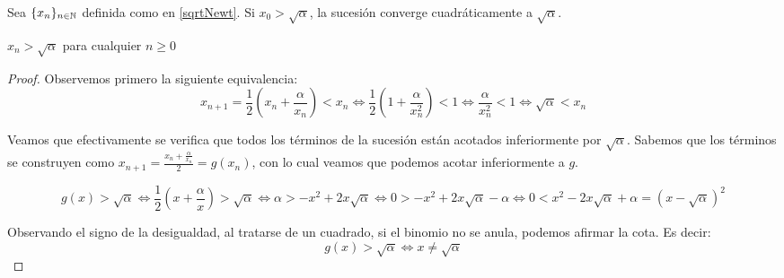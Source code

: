\begin{prop} 
Sea $\{x_n\}_{n\in\mathbb{N}}$ definida como en \ref{sqrtNewt}. Si $x_0 > \sqrt{\alpha}$, la sucesión converge cuadráticamente a $\sqrt{\alpha}$.
\begin{lema}
$x_n > \sqrt{\alpha}$ para cualquier $ n \geq 0$
\begin{proof}
Observemos primero la siguiente equivalencia:
$$x_{n+1} = \displaystyle \frac{1}{2} (x_{n} + \frac{\alpha}{x_{n}}) < x_n \Leftrightarrow \displaystyle \frac{1}{2} (1 + \frac{\alpha}{x^2_{n}}) < 1 \Leftrightarrow \frac{\alpha}{x_n^2} < 1 \Leftrightarrow \sqrt{\alpha} < x_n$$

Veamos que efectivamente se verifica que todos los términos de la sucesión están acotados inferiormente por $\sqrt{\alpha}$. Sabemos que los términos se construyen como $x_{n+1} =  \frac{x_n + \frac{\alpha}{x_n}}{2} = g(x_n)$, con lo cual veamos que podemos acotar inferiormente a $g$.

$$g(x) > \sqrt{\alpha} \Leftrightarrow \frac{1}{2}(x + \frac{\alpha}{x}) > \sqrt{\alpha} \Leftrightarrow  \alpha > -x^2 + 2x\sqrt{\alpha} \Leftrightarrow  0 > -x^2 + 2x\sqrt{\alpha} - \alpha \Leftrightarrow  0 < x^2 - 2x\sqrt{\alpha} + \alpha = (x-\sqrt{\alpha})^2$$  

Observando el signo de la desigualdad, al tratarse de un cuadrado, si el binomio no se anula, podemos afirmar la cota. Es decir:
$$g(x) > \sqrt{\alpha} \Leftrightarrow x \neq \sqrt{\alpha}$$


\end{proof}
\end{lema}
\end{prop}
